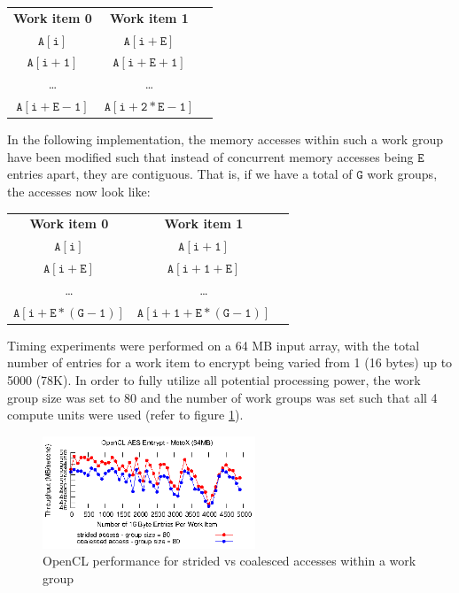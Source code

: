 \documentclass[conference,10pt]{IEEEtran}
\begin{document}
\begin{table}[h]
\centering
\begin{tabular}{ccc}
    \textbf{Work item 0} & \textbf{Work item 1} \\
    $\mathtt{A[i]}$         & $\mathtt{A[i + E]}$ \\
    $\mathtt{A[i + 1]}$     & $\mathtt{A[i + E + 1]}$ \\
    \ldots       & \ldots \\
    $\mathtt{A[i + E - 1]}$ & $\mathtt{A[i + 2*E - 1]}$ \\
\end{tabular}
\end{table}

In the following implementation, the memory accesses within such a work group have been modified such that 
instead of concurrent memory accesses being $\mathtt{E}$ entries apart, they are contiguous.  That is, if 
we have a total of $\mathtt{G}$ work groups, the accesses now look like:

\begin{table}[h]
\centering
\begin{tabular}{ccc}
    \textbf{Work item 0} & \textbf{Work item 1} \\
    $\mathtt{A[i]}$         & $\mathtt{A[i + 1]}$ \\
    $\mathtt{A[i + E]}$     & $\mathtt{A[i + 1 + E]}$ \\
    \ldots       & \ldots \\
    $\mathtt{A[i + E*(G - 1)]}$ & $\mathtt{A[i + 1 + E*(G - 1)]}$ \\
\end{tabular}
\end{table}

Timing experiments were performed on a 64 MB input array, with the total number of entries for a work item 
to encrypt being varied from 1 (16 bytes) up to 5000 (78K).  In order to fully utilize all potential 
processing power, the work group size was set to 80 and the number of work groups was set such that all 4 
compute units were used (refer to figure \ref{fig:coalesce}).

\begin{figure}[!t]
\centering
\includegraphics[width=2.5in]{../final/motox/4.2/sample_opencl_aes_entries.64MB.4_work_groups.5000_max_entries.both.eps}
\caption{OpenCL performance for strided vs coalesced accesses within a work group}
\label{fig:coalesce}
\end{figure}
\end{document}
